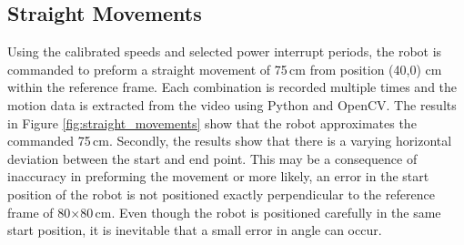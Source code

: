 \subsection{Straight Movements}
\label{eval:straight_movements}

Using the calibrated speeds and selected power interrupt periods, the robot is commanded to preform a straight movement of 75\,cm from position (40,0) cm within the reference frame.
Each combination is recorded multiple times and the motion data is extracted from the video using Python and OpenCV.
The results in Figure \ref{fig:straight_movements} show that the robot approximates the commanded 75\,cm.
Secondly, the results show that there is a varying horizontal deviation between the start and end point.
This may be a consequence of inaccuracy in preforming the movement or more likely, an error in the start position of the robot is not positioned exactly perpendicular to the reference frame of 80$\times$80\,cm.
Even though the robot is positioned carefully in the same start position, it is inevitable that a small error in angle can occur.

